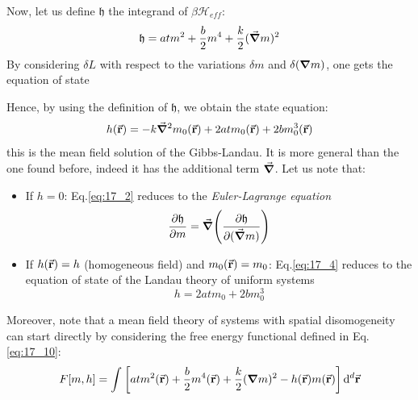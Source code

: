 \documentclass[../main/main.tex]{subfiles}
\begin{document}
Now, let us define \( \mathfrak{h} \) the integrand of \( \beta \mathcal{H}_{eff} \):
\begin{equation*}
  \mathfrak{h} = a t m^2 + \frac{b}{2} m^4 + \frac{k}{2} (\va{\grad } m)^2
\end{equation*}
By considering \( \delta L \) with respect to the variations \( \delta m \) and \( \delta (\grad m) \), one gets the equation of state
Hence, by using the definition of \( \mathfrak{h} \), we obtain the state equation:
\begin{equation}
  h (\va{r}) = - k \va{\grad } ^2 m_0 (\va{r}) + 2 a t m _0 (\va{r}) + 2 b m_0^3 (\va{r})
   \label{eq:17_4}
\end{equation}
  this is the mean field solution of the Gibbs-Landau. It is more general than the one found before, indeed it has the additional term \( \va{\grad } \).
Let us note that:
\begin{itemize}
\item If \( h= 0 \): Eq.\eqref{eq:17_2} reduces to the \emph{Euler-Lagrange equation}
\begin{equation}
  \pdv{\mathfrak{h} }{m} = \va{\grad } \qty(  \pdv{\mathfrak{h}}{(\va{\grad } m)})
  \label{eq:17_11}
\end{equation}

\item If \( h (\va{r}) = h \) (homogeneous field) and \( m_0 (\va{r})=m_0 \): Eq.\eqref{eq:17_4} reduces to the equation of state of the Landau theory of uniform systems
\begin{equation*}
  h = 2 a t m_0 + 2 b m_0 ^3
\end{equation*}

\end{itemize}

 \begin{remark}
Moreover, note that a mean field theory of systems with spatial disomogeneity can start directly by considering the free energy functional defined in Eq.\eqref{eq:17_10}:
   \begin{equation*}
     F[m,h] = \int_{}^{}  \qty[a t m^2 (\va{r}) + \frac{b}{2} m^4 (\va{r}) + \frac{k}{2} (\grad m)^2 - h (\va{r}) m(\va{r})] \dd[d]{\va{r}}
   \end{equation*}
\end{remark}
\end{document}
